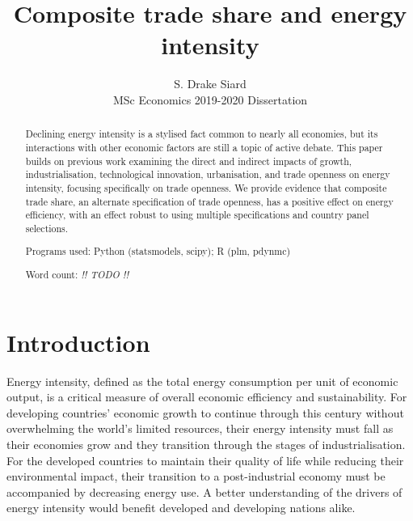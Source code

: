 \documentclass[12pt,a4paper]{article}
\title{Composite trade share and energy intensity}
\author{S. Drake Siard\\
MSc Economics 2019-2020 Dissertation}
\date{}
\newcommand{\pkg}[1]{{\fontseries{b}\selectfont #1}}
\begin{document}
\maketitle

\begin{abstract}
Declining energy intensity is a stylised fact common to nearly all economies, but its interactions with other economic factors are still a topic of active debate.
This paper builds on previous work examining the direct and indirect impacts of growth, industrialisation, technological innovation, urbanisation, and trade openness on energy intensity, focusing specifically on trade openness. 
We provide evidence that composite trade share, an alternate specification of trade openness, has a positive effect on energy efficiency, with an effect robust to using multiple specifications and country panel selections. 

Programs used: Python (\pkg{statsmodels}, \pkg{scipy}); R (\pkg{plm}, \pkg{pdynmc})

Word count: \emph{!! TODO !!}
 
\end{abstract}

\pagebreak

\tableofcontents

\pagebreak

\listoffigures
\listoftables

\pagebreak

\section{Introduction}\label{sec:introduction}

Energy intensity, defined as the total energy consumption per unit of economic output, is a critical measure of overall economic efficiency and sustainability.
For developing countries' economic growth to continue through this century without overwhelming the world's limited resources, their energy intensity must fall as their economies grow and they transition through the stages of industrialisation.
For the developed countries to maintain their quality of life while reducing their environmental impact, their transition to a post-industrial economy must be accompanied by decreasing energy use.
A better understanding of the drivers of energy intensity would benefit developed and developing nations alike.
\end{document}
